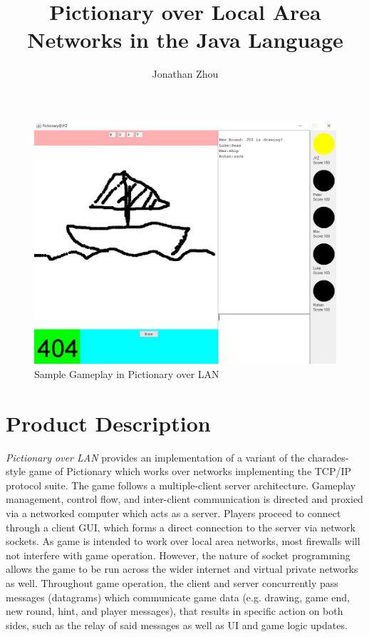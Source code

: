 \documentclass[12pt,letterpaper]{article}
\author{Jonathan Zhou}
\title{Pictionary over Local Area Networks in the Java Language}
\begin{document}
\maketitle

\begin{figure}[H]
\centering
\includegraphics[width=5in]{sampleGameplay.PNG}

\caption{Sample Gameplay in Pictionary over LAN}
\end{figure}
\thispagestyle{empty}

\newpage

\doublespacing

\section*{Product Description}

\textit{Pictionary over LAN} provides an implementation of a variant of the charades-style game of Pictionary which works over networks implementing the TCP/IP protocol suite. The game follows a multiple-client server architecture. Gameplay management, control flow, and inter-client communication is directed and proxied via a networked computer which acts as a server. Players proceed to connect through a client GUI, which forms a direct connection to the server via network sockets. As game is intended to work over local area networks, most firewalls will not interfere with game operation. However, the nature of socket programming allows the game to be run across the wider internet and virtual private networks as well. Throughout game operation, the client and server concurrently pass messages (datagrams) which communicate game data (e.g. drawing, game end, new round, hint, and player messages), that results in specific action on both sides, such as the relay of said messages as well as UI and game logic updates.
\end{document}
